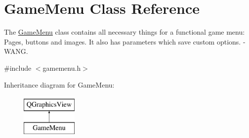 \hypertarget{class_game_menu}{}\section{Game\+Menu Class Reference}
\label{class_game_menu}


The \hyperlink{class_game_menu}{Game\+Menu} class contains all necessary things for a functional game menu\+: Pages, buttons and images. It also has parameters which save custom options. -\/ W\+A\+NG.  




{\ttfamily \#include $<$gamemenu.\+h$>$}

Inheritance diagram for Game\+Menu\+:\begin{figure}[H]
\begin{center}
\leavevmode
\includegraphics[height=2.000000cm]{class_game_menu}
\end{center}
\end{figure}
